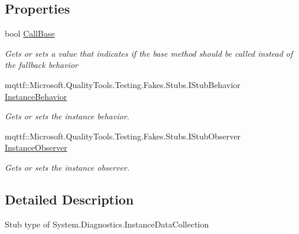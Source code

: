 \subsection*{Properties}
\begin{DoxyCompactItemize}
\item 
bool \hyperlink{class_system_1_1_diagnostics_1_1_fakes_1_1_stub_instance_data_collection_ae808bcdb2b63f9dfc1de33f9452c1da3}{Call\-Base}
\begin{DoxyCompactList}\small\item\em Gets or sets a value that indicates if the base method should be called instead of the fallback behavior\end{DoxyCompactList}\item 
mqttf\-::\-Microsoft.\-Quality\-Tools.\-Testing.\-Fakes.\-Stubs.\-I\-Stub\-Behavior \hyperlink{class_system_1_1_diagnostics_1_1_fakes_1_1_stub_instance_data_collection_a19c1b35e230c02926bd35cc7d6781e80}{Instance\-Behavior}
\begin{DoxyCompactList}\small\item\em Gets or sets the instance behavior.\end{DoxyCompactList}\item 
mqttf\-::\-Microsoft.\-Quality\-Tools.\-Testing.\-Fakes.\-Stubs.\-I\-Stub\-Observer \hyperlink{class_system_1_1_diagnostics_1_1_fakes_1_1_stub_instance_data_collection_aa2a38ab83ce764456aa5d4a0eb94edcb}{Instance\-Observer}
\begin{DoxyCompactList}\small\item\em Gets or sets the instance observer.\end{DoxyCompactList}\end{DoxyCompactItemize}


\subsection{Detailed Description}
Stub type of System.\-Diagnostics.\-Instance\-Data\-Collection



